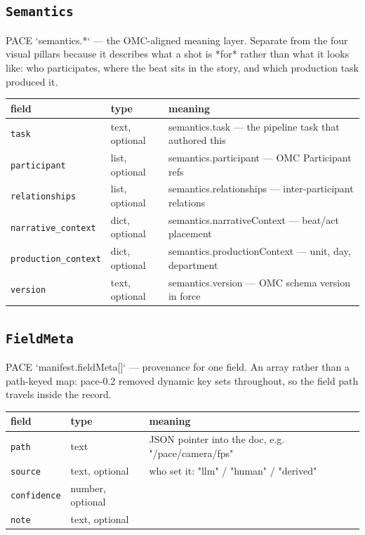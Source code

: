 \subsection*{\texttt{Semantics}}
\noindent PACE `semantics.*` ---\allowbreak{} the OMC-aligned meaning layer. Separate from the four visual pillars because it describes what a shot is *for* rather than what it looks like: who participates, where the beat sits in the story, and which production task produced it.

\begin{longtable}{@{}R{0.24\textwidth}R{0.21\textwidth}R{0.49\textwidth}@{}}
\toprule \textbf{field} & \textbf{type} & \textbf{meaning} \\ \midrule
\endhead
\texttt{task} & text, optional & semantics.task ---\allowbreak{} the pipeline task that authored this \\
\texttt{participant} & list, optional & semantics.participant ---\allowbreak{} OMC Participant refs \\
\texttt{relationships} & list, optional & semantics.relationships ---\allowbreak{} inter-participant relations \\
\texttt{narrative\_\allowbreak context} & dict, optional & semantics.narrativeContext ---\allowbreak{} beat/\allowbreak{}act placement \\
\texttt{production\_\allowbreak context} & dict, optional & semantics.productionContext ---\allowbreak{} unit, day, department \\
\texttt{version} & text, optional & semantics.version ---\allowbreak{} OMC schema version in force \\
\bottomrule
\end{longtable}

\subsection*{\texttt{FieldMeta}}
\noindent PACE `manifest.fieldMeta[]` ---\allowbreak{} provenance for one field. An array rather than a path-keyed map: pace-0.2 removed dynamic key sets throughout, so the field path travels inside the record.

\begin{longtable}{@{}R{0.24\textwidth}R{0.21\textwidth}R{0.49\textwidth}@{}}
\toprule \textbf{field} & \textbf{type} & \textbf{meaning} \\ \midrule
\endhead
\texttt{path} & text & JSON pointer into the doc, e.g. "/\allowbreak{}pace/\allowbreak{}camera/\allowbreak{}fps" \\
\texttt{source} & text, optional & who set it: "llm" /\allowbreak{} "human" /\allowbreak{} "derived" \\
\texttt{confidence} & number, optional &  \\
\texttt{note} & text, optional &  \\
\bottomrule
\end{longtable}

